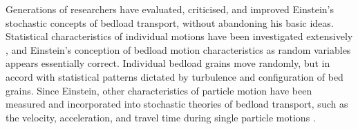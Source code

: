 \documentclass{article}
\begin{document}





Generations of researchers have evaluated, criticised, and improved Einstein's stochastic concepts of bedload transport, without abandoning his basic ideas. 
Statistical characteristics of individual motions have been investigated extensively \citep{Hubbell1964, Yano1969, Nakagawa1976, Hassan1991, Habersack2001, Ancey2008, Roseberry2012, Heyman2013, Heyman2016}, and Einstein's conception of bedload motion characteristics as random variables appears essentially correct. 
Individual bedload grains move randomly, but in accord with statistical patterns dictated by turbulence and configuration of bed grains.  
Since Einstein, other characteristics of particle motion have been measured and incorporated into stochastic theories of bedload transport, such as the velocity, acceleration, and travel time during single particle motions \citep{Drake1988, Radice2006, Ancey2008, Lajeunesse2010, Furbish2012a, Roseberry2012, Furbish2015, Fathel2015, Heyman2016}. 
\end{document}
